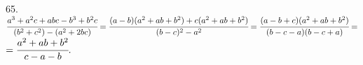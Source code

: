 65. $\cfrac{a^3+a^2c+abc-b^3+b^2c}{(b^2+c^2)-(a^2+2bc)}=\cfrac{(a-b)(a^2+ab+b^2)+c(a^2+ab+b^2)}{(b-c)^2-a^2}=
\cfrac{(a-b+c)(a^2+ab+b^2)}{(b-c-a)(b-c+a)}=$\\$=\cfrac{a^2+ab+b^2}{c-a-b}.$\\
